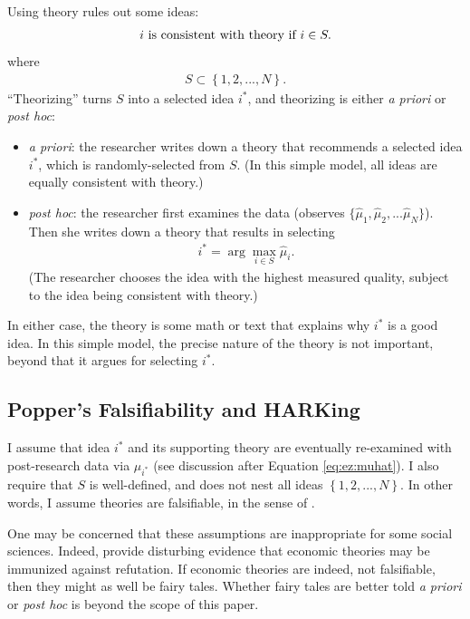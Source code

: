 \documentclass[12pt,english]{article}
\theoremstyle{plain}
\theoremstyle{plain}
\begin{document}
Using theory rules out some ideas:
\begin{align}
    \text{\ensuremath{i} is consistent with theory if }i\in S .
\end{align}
where
\begin{align}
    S \subset \left\{ 1,2,...,N\right\}
    \label{eq:ez:S}.
\end{align}
``Theorizing'' turns $S$ into a selected idea $i^\ast$, and theorizing is either \emph{a priori} or \emph{post hoc}: 
\begin{itemize}
\item \emph{a priori}: the researcher writes down a theory that recommends a selected idea $i^\ast$, which is randomly-selected from $S$. (In this simple model, all ideas are equally consistent with theory.)
\item \emph{post hoc}: the researcher first examines the data (observes $\{\hat{\mu}_1,\hat{\mu}_2,...\hat{\mu}_N\}$). Then she writes down a theory that results in selecting
\begin{align}
    i^\ast =  \arg\max_{i\in S }\hat{\mu}_{i}.\label{eq:given-ihat}
\end{align}
(The researcher chooses the idea with the highest measured quality, subject to the idea being consistent with theory.)
\end{itemize}
In either case, the theory is some math or text that explains why $i^\ast$ is a good idea. In this simple model, the precise nature of the theory is not important, beyond that it argues for selecting $i^\ast$. 

\subsection{Popper's Falsifiability and HARKing}

I assume that idea $i^\ast$ and its supporting theory are eventually re-examined with post-research data via $\mu_{i^\ast}$ (see discussion after Equation \eqref{eq:ez:muhat}).  I also require that $S$ is well-defined, and does not nest all ideas $\left\{1,2,...,N\right\}$.  In other words, I assume theories are falsifiable, in the sense of \citet{Popper1959}. 

One may be concerned that these assumptions are inappropriate for some social sciences. Indeed, \citet{ankel2025economics} provide disturbing evidence that economic theories may be immunized against refutation. If economic theories are indeed, not falsifiable, then they might as well be fairy tales. Whether fairy tales are better told \emph{a priori} or \emph{post hoc} is beyond the scope of this paper.
\end{document}
